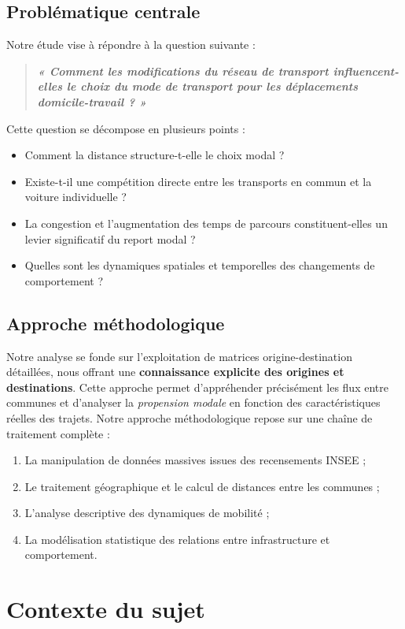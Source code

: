 \documentclass[11pt,a4paper]{article}
\begin{document}
\subsection{Problématique centrale}
Notre étude vise à répondre à la question suivante :
\begin{quote}
    \itshape \color{mainblue}
    \textbf{« Comment les modifications du réseau de transport influencent-elles le choix du mode de transport pour les déplacements domicile-travail ? »}
\end{quote}
Cette question se décompose en plusieurs points :
\begin{itemize}[label=\textbullet]
    \item Comment la distance structure-t-elle le choix modal ?
    \item Existe-t-il une compétition directe entre les transports en commun et la voiture individuelle ?
    \item La congestion et l'augmentation des temps de parcours constituent-elles un levier significatif du report modal ?
    \item Quelles sont les dynamiques spatiales et temporelles des changements de comportement ?
\end{itemize}
\subsection{Approche méthodologique}
Notre analyse se fonde sur l'exploitation de matrices origine-destination détaillées, nous offrant une \textbf{connaissance explicite des origines et destinations}. Cette approche permet d'appréhender précisément les flux entre communes et d'analyser la \textit{propension modale} en fonction des caractéristiques réelles des trajets.
Notre approche méthodologique repose sur une chaîne de traitement complète :
\begin{enumerate}
    \item La manipulation de données massives issues des recensements INSEE ;
    \item Le traitement géographique et le calcul de distances entre les communes ;
    \item L'analyse descriptive des dynamiques de mobilité ;
    \item La modélisation statistique des relations entre infrastructure et comportement.
\end{enumerate}
\section{Contexte du sujet}
\end{document}
